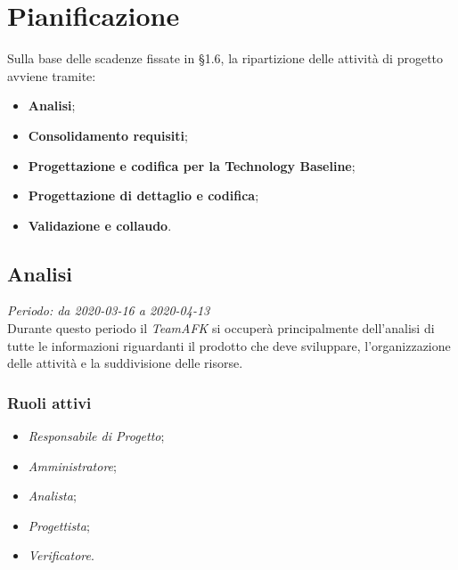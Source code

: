 \section{Pianificazione}
Sulla base delle scadenze fissate in §1.6, la ripartizione delle attività di progetto avviene tramite:
\begin{itemize}
\item \textbf{Analisi};
\item \textbf{Consolidamento requisiti};
\item \textbf{Progettazione e codifica per la Technology Baseline};
\item \textbf{Progettazione di dettaglio e codifica};
\item \textbf{Validazione e collaudo}.
\end{itemize}  

\subsection{Analisi}
\textit{Periodo: da 2020-03-16 a 2020-04-13} \\
Durante questo periodo il \textit{TeamAFK} si occuperà principalmente dell’analisi di tutte le informazioni riguardanti il prodotto che deve sviluppare, l’organizzazione delle attività e la suddivisione delle risorse.

\subsubsection{Ruoli attivi} 
\begin{itemize}
\item \textit{Responsabile di Progetto};
\item \textit{Amministratore};
\item \textit{Analista};
\item \textit{Progettista};
\item \textit{Verificatore}.
\end{itemize}

